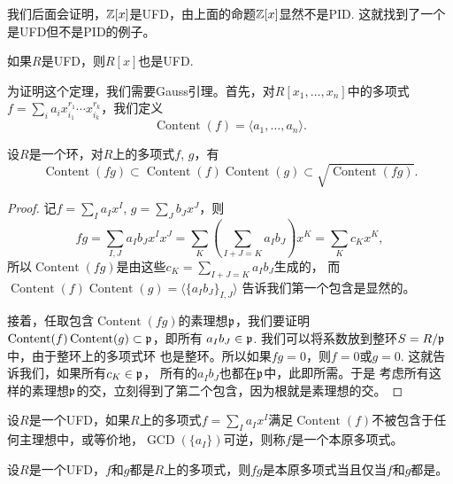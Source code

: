 我们后面会证明，$\mathbb{Z}[x]$是UFD，由上面的命题$\mathbb{Z}[x]$显然不是PID. 这就找到了一个是UFD但不是PID的例子。

\begin{thm}\label{ufd}
如果$R$是UFD，则$R[x]$也是UFD.
\end{thm}

为证明这个定理，我们需要Gauss引理。首先，对$R[x_1,\dots,x_n]$中的多项式$f=\sum_{i}a_ix^{r_1}_{i_1}\cdots x_{i_k}^{r_k}$，我们定义
\[
	\operatorname{Content}(f)=\langle a_1,\dots,a_n\rangle.
\]

\begin{lem}
	设$R$是一个环，对$R$上的多项式$f$, $g$，有
	\[
		\operatorname{Content}(fg)\subset
		\operatorname{Content}(f)\operatorname{Content}(g)
		\subset \sqrt{\operatorname{Content}(fg)}.
	\]
\end{lem}

\begin{proof}
	记$f=\sum_I a_I x^I$, $g=\sum_J b_J x^J$，则
	\[
		fg=\sum_{I,J}a_Ib_J x^Ix^J
		=\sum_{K}\left(\sum_{I+J=K}a_Ib_J\right)x^K
		=\sum_{K}c_Kx^K,
	\]
	所以$\operatorname{Content}(fg)$是由这些$c_K=\sum_{I+J=K}a_Ib_J$生成的，
	而$\operatorname{Content}(f)\operatorname{Content}(g)=\langle \{a_Ib_J\}_{I,J}\rangle$
	告诉我们第一个包含是显然的。

	接着，任取包含$\operatorname{Content}(fg)$的素理想$\mathfrak{p}$，我们要证明
	$\operatorname{Content}(f)\operatorname{Content}(g)\subset \mathfrak{p}$，即所有
	$a_Ib_J\in \mathfrak{p}$. 我们可以将系数放到整环$S=R/\mathfrak{p}$中，由于整环上的多项式环
	也是整环。所以如果$fg=0$，则$f=0$或$g=0$. 这就告诉我们，如果所有$c_K\in \mathfrak{p}$，
	所有的$a_Ib_J$也都在$\mathfrak{p}$中，此即所需。于是
	考虑所有这样的素理想$\mathfrak{p}$的交，立刻得到了第二个包含，因为根就是素理想的交。
\end{proof}

\begin{para}[本原多项式]
	设$R$是一个UFD，如果$R$上的多项式$f=\sum_{I}a_Ix^I$满足$\operatorname{Content}(f)$不被包含于任何主理想中，或等价地，$\operatorname{GCD}(\{a_I\})$可逆，则称$f$是一个本原多项式。
\end{para}

\begin{lem}
	设$R$是一个UFD，$f$和$g$都是$R$上的多项式，则$fg$是本原多项式当且仅当$f$和$g$都是。
\end{lem}

